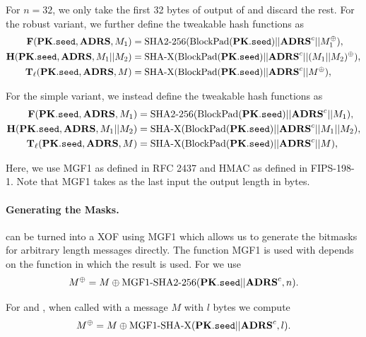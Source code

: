    For $n=32$, we only take the first 32 bytes of output of \sphincsPRF and discard the rest. For the robust variant, we further define the tweakable hash functions as
   \begin{equation}
   \begin{aligned}
      \mathbf{F}(\mathbf{PK}.\texttt{seed}, \textbf{ADRS}, M_1) &= \text{SHA2-256}(\text{BlockPad}(\mathbf{PK}.\texttt{seed}) || \textbf{ADRS}^{c} || M_1^{\oplus}),\\
      \mathbf{H}(\mathbf{PK}.\texttt{seed}, \textbf{ADRS}, M_1 || M_2) &= \text{SHA-X}(\text{BlockPad}(\mathbf{PK}.\texttt{seed}) || \textbf{ADRS}^{c} || (M_1|| M_2)^{\oplus}),\\
      \mathbf{T}_\ell(\mathbf{PK}.\texttt{seed}, \textbf{ADRS}, M) &= \text{SHA-X}(\text{BlockPad}(\mathbf{PK}.\texttt{seed}) || \textbf{ADRS}^{c} || M^{\oplus}),\\
   \end{aligned}
   \end{equation}

   For the simple variant, we instead define the tweakable hash functions as
   \begin{equation}
   \begin{aligned}
      \mathbf{F}(\mathbf{PK}.\texttt{seed}, \textbf{ADRS}, M_1) &= \text{SHA2-256}(\text{BlockPad}(\mathbf{PK}.\texttt{seed}) || \textbf{ADRS}^{c} || M_1),\\
      \mathbf{H}(\mathbf{PK}.\texttt{seed}, \textbf{ADRS}, M_1 || M_2) &= \text{SHA-X}(\text{BlockPad}(\mathbf{PK}.\texttt{seed}) || \textbf{ADRS}^{c} || M_1 || M_2),\\
      \mathbf{T}_\ell(\mathbf{PK}.\texttt{seed}, \textbf{ADRS}, M) &= \text{SHA-X}(\text{BlockPad}(\mathbf{PK}.\texttt{seed}) || \textbf{ADRS}^{c} || M),\\
   \end{aligned}
   \end{equation}

   Here, we use MGF1 as defined in RFC 2437 and HMAC as defined in FIPS-198-1. 
   Note that MGF1 takes as the last input the output length in bytes.
   \paragraph{Generating the Masks.} \shatwo can be turned into a XOF using MGF1
   which allows us to generate the bitmasks for arbitrary length messages directly. The function MGF1 is used with depends on the function in which the result is used. For \sphincsF we use 
   \begin{equation*}
      M^{\oplus} = M \oplus \text{MGF1-}\text{SHA2-256}(\mathbf{PK}.\texttt{seed} || \textbf{ADRS}^{c}, n).
   \end{equation*}

   For \sphincsH and \sphincsT, when called with a message $M$ with $l$ bytes we compute
   \begin{equation*}
      M^{\oplus} = M \oplus \text{MGF1-}\text{SHA-X}(\mathbf{PK}.\texttt{seed} || \textbf{ADRS}^{c}, l).
   \end{equation*}

